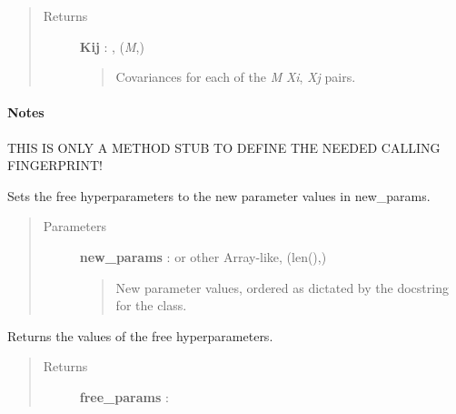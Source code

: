 \documentclass[letterpaper,10pt,english]{sphinxmanual}
\begin{document}
\begin{fulllineitems}
\begin{fulllineitems}
\begin{quote}
\begin{description}
\item[{Returns }] \leavevmode
\textbf{Kij} : , (\emph{M},)
\begin{quote}

Covariances for each of the \emph{M} \emph{Xi}, \emph{Xj} pairs.
\end{quote}

\end{description}\end{quote}
\paragraph{Notes}

THIS IS ONLY A METHOD STUB TO DEFINE THE NEEDED CALLING FINGERPRINT!

\end{fulllineitems}


\begin{fulllineitems}
\label{gptools.kernel:gptools.kernel.core.Kernel.set_hyperparams}
Sets the free hyperparameters to the new parameter values in new\_params.
\begin{quote}\begin{description}
\item[{Parameters }] \leavevmode
\textbf{new\_params} :  or other Array-like, (len(),)
\begin{quote}

New parameter values, ordered as dictated by the docstring for the
class.
\end{quote}

\end{description}\end{quote}

\end{fulllineitems}


\begin{fulllineitems}
\label{gptools.kernel:gptools.kernel.core.Kernel.free_params}
Returns the values of the free hyperparameters.
\begin{quote}\begin{description}
\item[{Returns }] \leavevmode
\textbf{free\_params} : 
\begin{quote}


\end{quote}
\end{description}
\end{quote}
\end{fulllineitems}
\end{fulllineitems}
\end{document}
